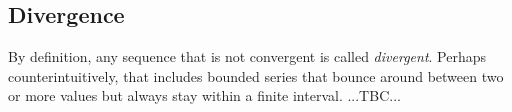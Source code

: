 





\subsection{Divergence}
By definition, any sequence that is not convergent is called \emph{divergent}. Perhaps counterintuitively, that includes bounded series that bounce around between two or more values but always stay within a finite interval. ...TBC...

